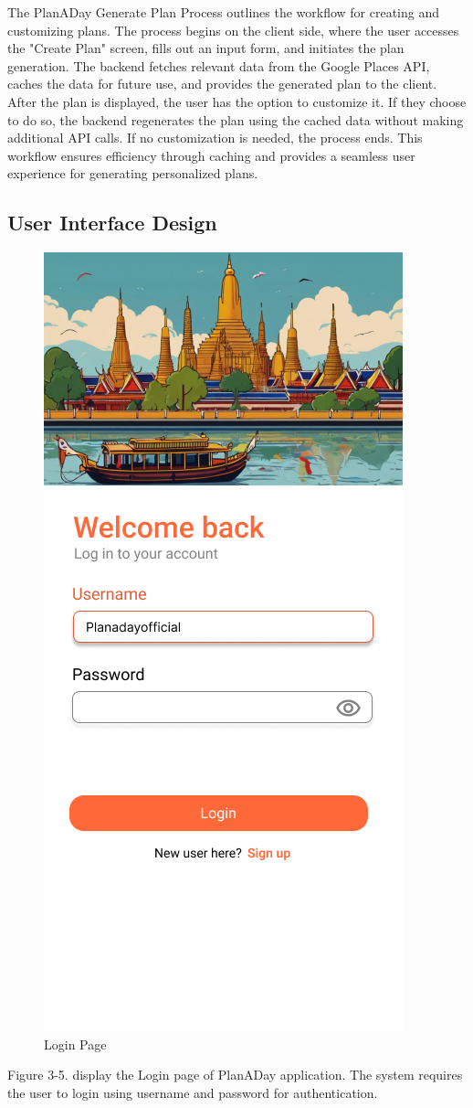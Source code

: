 \par
The PlanADay Generate Plan Process outlines the workflow for creating and customizing
plans. The process begins on the client side, where the user accesses the "Create Plan" screen,
fills out an input form, and initiates the plan generation. The backend fetches relevant data from
the Google Places API, caches the data for future use, and provides the generated plan to the
client. After the plan is displayed, the user has the option to customize it. If they choose to do so,
the backend regenerates the plan using the cached data without making additional API calls. If
no customization is needed, the process ends. This workflow ensures efficiency through caching
and provides a seamless user experience for generating personalized plans.
\newpage
\subsection{User Interface Design}

\begin{figure}[!h]
    \centering
    \includegraphics[width=0.5\linewidth]{chapter3/UI_Login_page.png}
    \caption{Login Page}
    \label{fig:Login Page}
\end{figure}
\noindent
Figure 3-5. display the Login page of PlanADay application. The system requires
the user to login using username and password for authentication.

